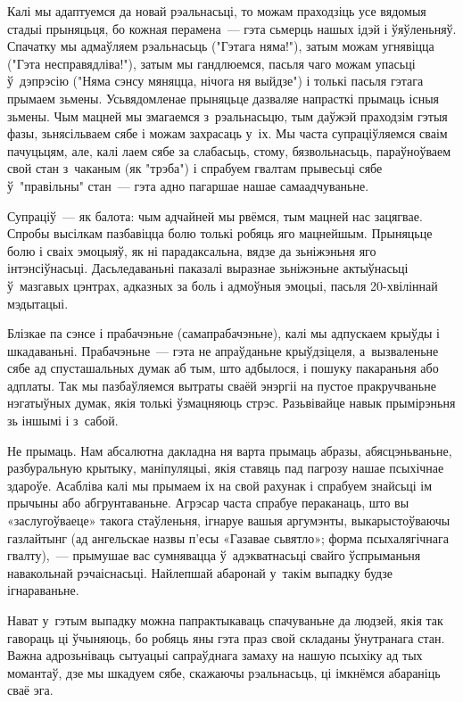 Калі мы адаптуемся да новай рэальнасьці, то можам праходзіць усе вядомыя стадыі прыняцьця, бо кожная перамена~--- гэта сьмерць нашых ідэй і ўяўленьняў. Спачатку мы адмаўляем рэальнасьць ("Гэтага няма!"), затым можам угнявіцца ("Гэта несправядліва!"), затым мы гандлюемся, пасьля чаго можам упасьці ў~дэпрэсію ("Няма сэнсу мяняцца, нічога ня выйдзе") і толькі пасьля гэтага прымаем зьмены. Усьвядомленае прыняцьце дазваляе напрасткі прымаць існыя зьмены. Чым мацней мы змагаемся з~рэальнасьцю, тым даўжэй праходзім гэтыя фазы, зьнясільваем сябе і можам захрасаць у~іх. Мы часта супраціўляемся сваім пачуцьцям, але, калі лаем сябе за слабасьць, стому, бязвольнасьць, параўноўваем свой стан з~чаканым (як "трэба") і спрабуем гвалтам прывесьці сябе ў~"правільны" стан~--- гэта адно пагаршае нашае самаадчуваньне.

Супраціў~--- як балота: чым адчайней мы рвёмся, тым мацней нас зацягвае. Спробы высілкам пазбавіцца болю толькі робяць яго мацнейшым. Прыняцьце болю і сваіх эмоцыяў, як ні парадаксальна, вядзе да зьніжэньня яго інтэнсіўнасьці. Дасьледаваньні паказалі выразнае зьніжэньне актыўнасьці ў~мазгавых цэнтрах, адказных за боль і адмоўныя эмоцыі, пасьля 20-хвіліннай мэдытацыі.

Блізкае па сэнсе і прабачэньне (самапрабачэньне), калі мы адпускаем крыўды і шкадаваньні. Прабачэньне~--- гэта не апраўданьне крыўдзіцеля, а~вызваленьне сябе ад спусташальных думак аб тым, што адбылося, і пошуку пакараньня або адплаты. Так мы пазбаўляемся вытраты сваёй энэргіі на пустое пракручваньне нэгатыўных думак, якія толькі ўзмацняюць стрэс. Разьвівайце навык прымірэньня зь іншымі і з~сабой.

Не прымаць. Нам абсалютна дакладна ня варта прымаць абразы, абясцэньваньне, разбуральную крытыку, маніпуляцыі, якія ставяць пад пагрозу нашае псыхічнае здароўе. Асабліва калі мы прымаем іх на свой рахунак і спрабуем знайсьці ім прычыны або абгрунтаваньне. Агрэсар часта спрабуе пераканаць, што вы «заслугоўваеце» такога стаўленьня, ігнаруе вашыя аргумэнты, выкарыстоўваючы газлайтынг (ад ангельскае назвы п'есы «Газавае сьвятло»; форма псыхалягічнага гвалту),~--- прымушае вас сумнявацца ў~адэкватнасьці свайго ўспрыманьня навакольнай рэчаіснасьці. Найлепшай абаронай у~такім выпадку будзе ігнараваньне.

Нават у~гэтым выпадку можна папрактыкаваць спачуваньне да людзей, якія так гавораць ці ўчыняюць, бо робяць яны гэта праз свой складаны ўнутранага стан. Важна адрозьніваць сытуацыі сапраўднага замаху на нашую псыхіку ад тых момантаў, дзе мы шкадуем сябе, скажаючы рэальнасьць, ці імкнёмся абараніць сваё эга.

